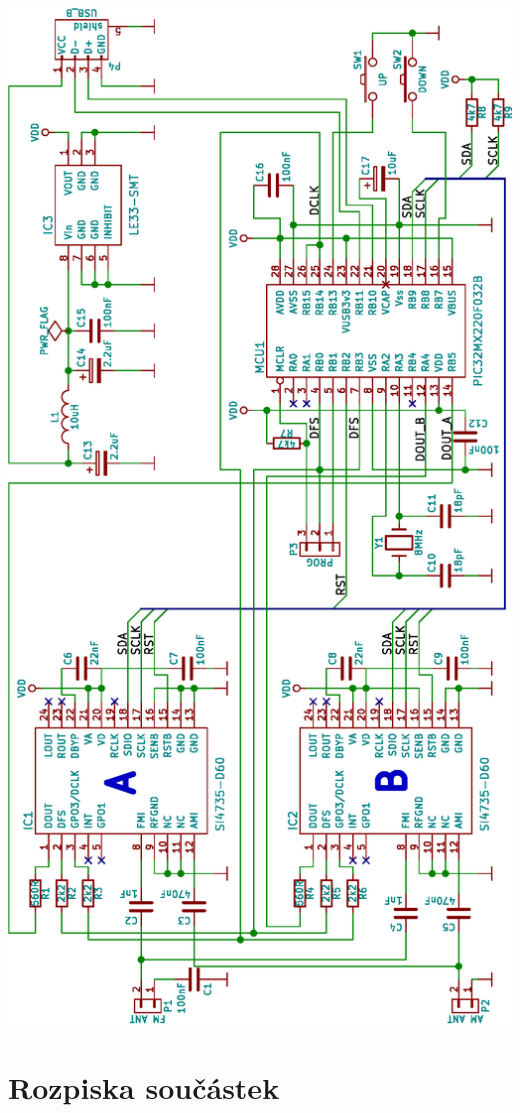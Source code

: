 \documentclass[czech,master,public,dept460,male,cpdeclaration]{diploma}	%
\begin{document}
\begin{center}
 \includegraphics[scale=0.72]{figures/dfmt.eps}
\end{center}
 
\section{Rozpiska součástek}


\clearpage

\end{document}
